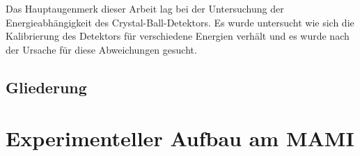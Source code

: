 \documentclass[a4paper,11pt,oneside,final,german,openbib,pdftex]{scrbook}
\begin{document}
{Das Hauptaugenmerk dieser Arbeit lag bei der Untersuchung der Energieabh\"angigkeit des Crystal-Ball-Detektors. Es wurde untersucht wie sich die Kalibrierung des Detektors f\"ur verschiedene Energien verh\"alt und es wurde nach der Ursache f\"ur diese Abweichungen gesucht. 
\newline	 
	
	
\section{Gliederung}






\chapter{Experimenteller Aufbau am MAMI}





}
\end{document}
